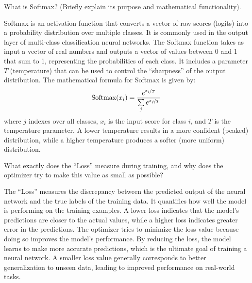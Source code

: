\begin{ejercicio}
    What is Softmax? (Briefly explain its purpose and mathematical functionality).

    Softmax is an activation function that converts a vector of raw scores (logits) into a probability distribution over multiple classes. It is commonly used in the output layer of multi-class classification neural networks. The Softmax function takes as input a vector of real numbers and outputs a vector of values between 0 and 1 that sum to 1, representing the probabilities of each class. It includes a parameter $T$ (temperature) that can be used to control the ``sharpness'' of the output distribution. The mathematical formula for Softmax is given by:
\[
\text{Softmax}(x_i) = \frac{e^{\nicefrac{x_i}{T}}}{\sum\limits_{j} e^{\nicefrac{x_j}{T}}}
\]
    where $j$ indexes over all classes, $x_i$ is the input score for class $i$, and $T$ is the temperature parameter. A lower temperature results in a more confident (peaked) distribution, while a higher temperature produces a softer (more uniform) distribution.
\end{ejercicio}

\begin{ejercicio}
    What exactly does the ``Loss'' measure during training, and why does the optimizer try to make this value as small as possible?

    The ``Loss'' measures the discrepancy between the predicted output of the neural network and the true labels of the training data. It quantifies how well the model is performing on the training examples. A lower loss indicates that the model's predictions are closer to the actual values, while a higher loss indicates greater error in the predictions.
    The optimizer tries to minimize the loss value because doing so improves the model's performance. By reducing the loss, the model learns to make more accurate predictions, which is the ultimate goal of training a neural network. A smaller loss value generally corresponds to better generalization to unseen data, leading to improved performance on real-world tasks.
\end{ejercicio}


